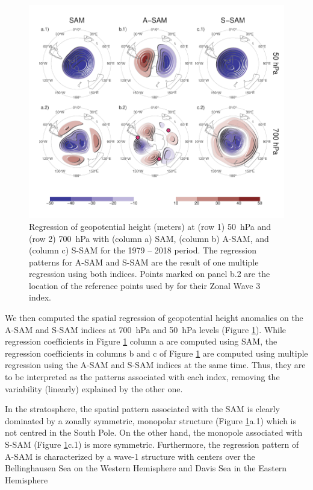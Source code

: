 \documentclass[smallextended]{svjour3}       %
\begin{document}
\begin{figure}
\includegraphics{2d-regr-1} \caption{Regression of geopotential height (meters) at (row 1) 50~hPa and (row 2) 700~hPa with (column a) SAM, (column b) A\nobreakdash-SAM, and (column c) S\nobreakdash-SAM for the 1979 -- 2018 period. The regression patterns for A\nobreakdash-SAM and S\nobreakdash-SAM are the result of one multiple regression using both indices. Points marked on panel b.2 are the location of the reference points used by \cite{raphael2004} for their Zonal Wave 3 index. }\label{fig:2d-regr}
\end{figure}

We then computed the spatial regression of geopotential height anomalies on the A\nobreakdash-SAM and S\nobreakdash-SAM indices at 700~hPa and 50~hPa levels (Figure \ref{fig:2d-regr}). While regression coefficients in Figure \ref{fig:2d-regr} column a are computed using SAM, the regression coefficients in columns b and c of Figure \ref{fig:2d-regr} are computed using multiple regression using the A\nobreakdash-SAM and S\nobreakdash-SAM indices at the same time. Thus, they are to be interpreted as the patterns associated with each index, removing the variability (linearly) explained by the other one.

In the stratosphere, the spatial pattern associated with the SAM is clearly dominated by a zonally symmetric, monopolar structure (Figure \ref{fig:2d-regr}a.1) which is not centred in the South Pole. On the other hand, the monopole associated with S\nobreakdash-SAM (Figure \ref{fig:2d-regr}c.1) is more symmetric. Furthermore, the regression pattern of A\nobreakdash-SAM is characterized by a wave-1 structure with centers over the Bellinghausen Sea on the Western Hemisphere and Davis Sea in the Eastern Hemisphere
\end{document}

